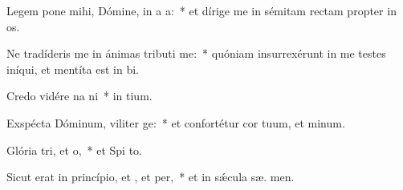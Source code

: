 \item Legem pone mihi, Dómine, in a a:~* et dírige me in sémitam rectam propter in os.
\item Ne tradíderis me in ánimas tributi me:~* quóniam insurrexérunt in me testes iníqui, et mentíta est in bi.
\item Credo vidére na ni~* in  tium.
\item Exspécta Dóminum, viliter ge:~* et confortétur cor tuum, et  minum.
\item Glória tri, et o,~* et Spi to.
\item Sicut erat in princípio, et , et per,~* et in sǽcula sæ. men.
